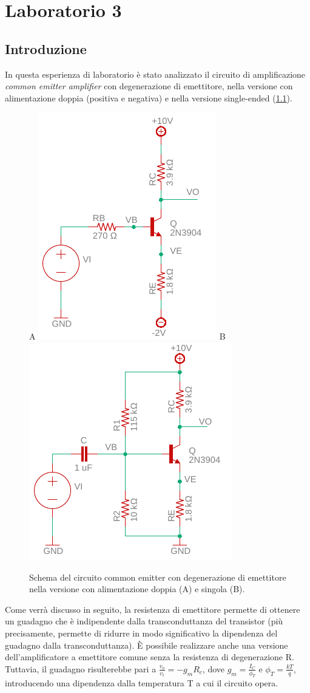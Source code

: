 \chapter{Laboratorio 3}
\section{Introduzione}
In questa esperienza di laboratorio è stato analizzato il circuito di amplificazione \textit{common emitter amplifier} con degenerazione di emettitore, nella versione con alimentazione doppia (positiva e negativa) e nella versione single-ended (\Fig\ref{fig:commonemitter}).
\begin{figure}[h!]
	\centering
	A
	\includegraphics[width=0.4\linewidth]{./OtherFiles/Laboratorio 3/common emitter}
	B
	\includegraphics[width=0.4\linewidth]{./OtherFiles/Laboratorio 3/common emitter_se}
	\caption{Schema del circuito common emitter con degenerazione di emettitore nella versione con alimentazione doppia (A) e singola (B).}
	\label{fig:commonemitter}
\end{figure}
Come verrà discusso in seguito, la resistenza di emettitore permette di ottenere un guadagno che è indipendente dalla transconduttanza del transistor (più precisamente, permette di ridurre in modo significativo la dipendenza del guadagno dalla transconduttanza). \`E possibile realizzare anche una versione dell'amplificatore a emettitore comune senza la resistenza di degenerazione R. Tuttavia, il guadagno risulterebbe pari a $\frac{v_o}{v_i}=-g_m R_c$, dove $g_m=\frac{I_C}{\phi_T}$ e $\phi_T=\frac{k T}{q}$, introducendo una dipendenza dalla temperatura T a cui il circuito opera.

